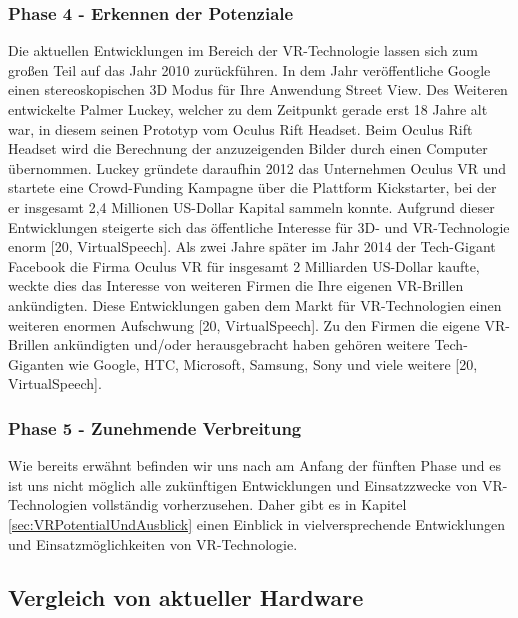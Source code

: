 \subsubsection{Phase 4 - Erkennen der Potenziale}
Die aktuellen Entwicklungen im Bereich der VR-Technologie lassen sich zum großen Teil auf das Jahr 2010 zurückführen.
\newline
In dem Jahr veröffentliche Google einen stereoskopischen 3D Modus für Ihre Anwendung Street View. Des Weiteren entwickelte Palmer Luckey, welcher zu dem Zeitpunkt gerade erst 18 Jahre alt war, in diesem seinen Prototyp vom Oculus Rift Headset. Beim Oculus Rift Headset wird die Berechnung der anzuzeigenden Bilder durch einen Computer übernommen. Luckey gründete daraufhin 2012 das Unternehmen Oculus VR und startete eine Crowd-Funding Kampagne über die Plattform Kickstarter, bei der er insgesamt 2,4 Millionen US-Dollar Kapital sammeln konnte. Aufgrund dieser Entwicklungen steigerte sich das öffentliche Interesse für 3D- und VR-Technologie enorm [20, VirtualSpeech].
\newline
Als zwei Jahre später im Jahr 2014 der Tech-Gigant Facebook die Firma Oculus VR für insgesamt 2 Milliarden US-Dollar kaufte, weckte dies das Interesse von weiteren Firmen die Ihre eigenen VR-Brillen ankündigten. Diese Entwicklungen gaben dem Markt für VR-Technologien einen weiteren enormen Aufschwung [20, VirtualSpeech].
\newline
Zu den Firmen die eigene VR-Brillen ankündigten und/oder herausgebracht haben gehören weitere Tech-Giganten wie Google, HTC, Microsoft, Samsung, Sony und viele weitere  [20, VirtualSpeech].

\subsubsection{Phase 5 - Zunehmende Verbreitung}
Wie bereits erwähnt befinden wir uns nach am Anfang der fünften Phase und es ist uns nicht möglich alle zukünftigen Entwicklungen und Einsatzzwecke von VR-Technologien vollständig vorherzusehen. Daher gibt es in Kapitel \ref{sec:VRPotentialUndAusblick} einen Einblick in vielversprechende Entwicklungen und Einsatzmöglichkeiten von VR-Technologie.

\subsection{Vergleich von aktueller Hardware}\label{sec:VRStandDerTechnik}


